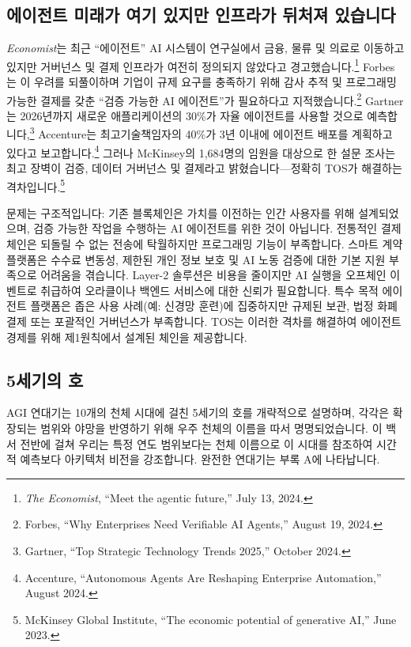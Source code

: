 \documentclass[11pt]{article}
\begin{document}
\subsection{에이전트 미래가 여기 있지만 인프라가 뒤처져 있습니다}
\emph{Economist}는 최근 ``에이전트'' AI 시스템이 연구실에서 금융, 물류 및 의료로 이동하고 있지만 거버넌스 및 결제 인프라가 여전히 정의되지 않았다고 경고했습니다.\footnote{\emph{The Economist}, ``Meet the agentic future,'' July 13, 2024.} Forbes는 이 우려를 되풀이하며 기업이 규제 요구를 충족하기 위해 감사 추적 및 프로그래밍 가능한 결제를 갖춘 ``검증 가능한 AI 에이전트''가 필요하다고 지적했습니다.\footnote{Forbes, ``Why Enterprises Need Verifiable AI Agents,'' August 19, 2024.} Gartner는 2026년까지 새로운 애플리케이션의 30\%가 자율 에이전트를 사용할 것으로 예측합니다,\footnote{Gartner, ``Top Strategic Technology Trends 2025,'' October 2024.} Accenture는 최고기술책임자의 40\%가 3년 이내에 에이전트 배포를 계획하고 있다고 보고합니다.\footnote{Accenture, ``Autonomous Agents Are Reshaping Enterprise Automation,'' August 2024.} 그러나 McKinsey의 1,684명의 임원을 대상으로 한 설문 조사는 최고 장벽이 검증, 데이터 거버넌스 및 결제라고 밝혔습니다---정확히 TOS가 해결하는 격차입니다.\footnote{McKinsey Global Institute, ``The economic potential of generative AI,'' June 2023.}

문제는 구조적입니다: 기존 블록체인은 가치를 이전하는 인간 사용자를 위해 설계되었으며, 검증 가능한 작업을 수행하는 AI 에이전트를 위한 것이 아닙니다. 전통적인 결제 체인은 되돌릴 수 없는 전송에 탁월하지만 프로그래밍 기능이 부족합니다. 스마트 계약 플랫폼은 수수료 변동성, 제한된 개인 정보 보호 및 AI 노동 검증에 대한 기본 지원 부족으로 어려움을 겪습니다. Layer-2 솔루션은 비용을 줄이지만 AI 실행을 오프체인 이벤트로 취급하여 오라클이나 백엔드 서비스에 대한 신뢰가 필요합니다. 특수 목적 에이전트 플랫폼은 좁은 사용 사례(예: 신경망 훈련)에 집중하지만 규제된 보관, 법정 화폐 결제 또는 포괄적인 거버넌스가 부족합니다. TOS는 이러한 격차를 해결하여 에이전트 경제를 위해 제1원칙에서 설계된 체인을 제공합니다.

\subsection{5세기의 호}
AGI 연대기는 10개의 천체 시대에 걸친 5세기의 호를 개략적으로 설명하며, 각각은 확장되는 범위와 야망을 반영하기 위해 우주 천체의 이름을 따서 명명되었습니다. 이 백서 전반에 걸쳐 우리는 특정 연도 범위보다는 천체 이름으로 이 시대를 참조하여 시간적 예측보다 아키텍처 비전을 강조합니다. 완전한 연대기는 부록 A에 나타납니다.
\end{document}
